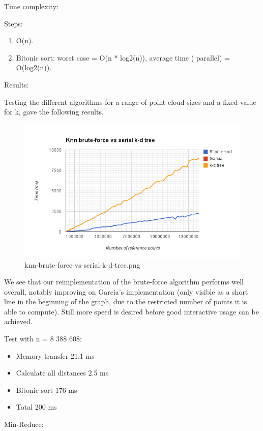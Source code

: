 Time complexity:

Steps:
\begin{enumerate}
    \item O(n).
    \item Bitonic sort: worst case = O(n * log2(n)), average time ( parallel) = O(log2(n)).
\end{enumerate}

Results:

Testing the different algorithms for a range of point cloud sizes and a fixed value for k, gave the following results.

\begin{figure}[ht!]
\centering
\includegraphics[width=120mm]{../gfx/knn-brute-force-vs-serial-k-d-tree.png}

\caption{knn-brute-force-vs-serial-k-d-tree.png}
\label{fig:knn_brute_force_vs_serial_k_d_tree}
\end{figure}

We see that our reimplementation of the brute-force algorithm performs well overall, notably improving on Garcia's implementation (only visible as a short line in the beginning of the graph, due to the restricted number of points it is able to compute). Still more speed is desired before good interactive usage can be achieved.

Test with n = 8 388 608:

\begin{itemize}
    \item Memory transfer 21.1 ms
    \item Calculate all distances 2.5 ms
    \item Bitonic sort 176 ms
    \item Total 200 ms
\end{itemize}

Min-Reduce:

